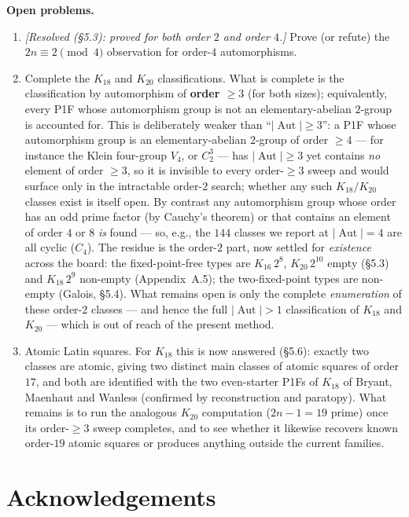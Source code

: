 \documentclass[11pt,reqno]{amsart}
\theoremstyle{plain}
\theoremstyle{definition}
\numberwithin{theorem}{section}
\newcommand{\Aut}{\operatorname{Aut}}
\begin{document}
\medskip
\noindent\textbf{Open problems.}
\begin{enumerate}
\item \emph{[Resolved (\S5.3): proved for both order $2$ and order $4$.]} Prove (or refute) the $2n\equiv 2\pmod 4$ observation for order-$4$ automorphisms.
\item Complete the $K_{18}$ and $K_{20}$ classifications. What is complete is the
classification by automorphism of \textbf{order $\ge 3$} (for both sizes); equivalently,
every P1F whose automorphism group is not an elementary-abelian $2$-group is
accounted for. This is deliberately weaker than ``$|\Aut|\ge3$'': a P1F whose
automorphism group is an elementary-abelian $2$-group of order $\ge4$ --- for instance
the Klein four-group $V_4$, or $C_2^3$ --- has $|\Aut|\ge3$ yet contains \emph{no}
element of order $\ge3$, so it is invisible to every order-$\ge3$ sweep and would
surface only in the intractable order-$2$ search; whether any such $K_{18}/K_{20}$
classes exist is itself open. By contrast any automorphism group whose order has an odd
prime factor (by Cauchy's theorem) or that contains an element of order $4$ or $8$ \emph{is}
found --- so, e.g., the $144$ classes we report at $|\Aut|=4$ are all cyclic
($C_4$). The residue is the order-$2$ part, now settled for \emph{existence} across
the board: the fixed-point-free types are $K_{16}\,2^8$, $K_{20}\,2^{10}$ empty (\S5.3)
and $K_{18}\,2^9$ non-empty (Appendix~A.5); the two-fixed-point types are non-empty
(Galois, \S5.4). What remains open is only the complete \emph{enumeration} of these order-$2$
classes --- and hence the full $|\Aut|>1$ classification of $K_{18}$ and $K_{20}$ ---
which is out of reach of the present method.
\item Atomic Latin squares. For $K_{18}$ this is now answered (\S5.6): exactly two classes
are atomic, giving two distinct main classes of atomic squares of order $17$, and both are
identified with the two even-starter P1Fs of $K_{18}$ of Bryant, Maenhaut and Wanless
\cite{BryantMaenhautWanless} (confirmed by reconstruction and paratopy). What remains is to
run the analogous $K_{20}$ computation ($2n-1=19$ prime) once its order-$\ge 3$ sweep
completes, and to see whether it likewise recovers known order-$19$ atomic squares or
produces anything outside the current families.
\end{enumerate}

\section*{Acknowledgements}
\end{document}

